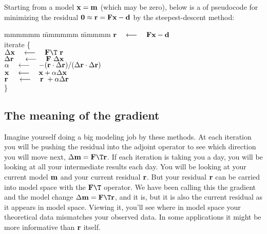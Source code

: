 \par
Starting from a model $\bold x = \bold m$ (which may be zero),
below is a  of pseudocode for minimizing the residual
$\bold 0\approx \bold r = \bold F \bold x - \bold d$
by the steepest-descent method:
\label{lsq/'sdtemplate'}
\begin{tabbing}
mmmmmm \= mmmmmm \= mmmmm \kill
\> $\bold r \quad\longleftarrow\quad \bold F \bold x - \bold d$ \\
\> {\rm iterate \{ }                                                    \\
\>      \>  $\Delta \bold x   \padarrow \bold F\T\         \bold r$      \\
\>      \>  $\Delta \bold r\  \quad\longleftarrow\quad \bold F \  \Delta \bold x$      \\
\>      \> $\alpha \quad\longleftarrow\quad
                -(       \bold r \cdot \Delta\bold r )/
                 (\Delta \bold r \cdot \Delta\bold r )
                $
                \\
\>      \> $\bold x   \quad\longleftarrow\quad \bold x   + \alpha\Delta \bold x$       \\
\>      \> $\bold r\  \quad\longleftarrow\quad \bold r\  + \alpha\Delta \bold r$       \\
\>      \> \}                                                   
\end{tabbing}

\subsection{The meaning of the gradient}
Imagine yourself doing a big modeling job by these methods.
At each iteration you will be pushing the residual into
the adjoint operator to see which direction you will move next,
$\Delta \bold m = \bold F\T\bold r$.
If each iteration is taking you a day,
you will be looking at all your intermediate results each day.
You will be looking at your current model $\bold m$ and your
current residual $\bold r$.
But your residual $\bold r$ can be carried into model space
with the $\bold F\T$ operator.
We have been calling this the gradient and the model change
$\Delta \bold m = \bold F\T\bold r$,
and it is, but it is also the current residual
as it appears in model space.
Viewing it, you'll see where in model space
your theoretical data mismatches your observed data.
In some applications it might be more informative than $\bold r$ itself.
\par

